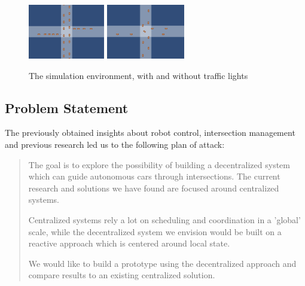 
\begin{figure}[b]
\centering
\includegraphics[height=90px]{img/intersection_tl}
\includegraphics[height=90px]{img/intersection}
\caption{The simulation environment, with and without traffic lights}
\label{fig:intersection}
\end{figure}

\subsection{Problem Statement}
The previously obtained insights about robot control, intersection management and previous research led us to the following plan of attack:
\begin{quotation}
The goal is to explore the possibility of building a decentralized system which can guide autonomous cars through intersections. 
The current research and solutions we have found are focused around centralized systems. 

Centralized systems rely a lot on scheduling and coordination in a 'global' scale, 
while the decentralized system we envision would be built on a reactive approach which is centered around local state. 

We would like to build a prototype using the decentralized approach and compare results to an existing centralized solution.
\end{quotation}
